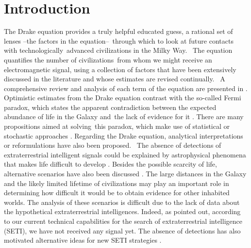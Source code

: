 \documentclass[crop]{CSLB}
\begin{document}
\maketitle


\section{Introduction}\label{S_motivations}

The Drake equation  \citep{drake_intelligent_1962} provides a truly
helpful educated guess, a rational set of lenses --the factors in the
equation-- through which to look at future contacts with
technologically advanced civilizations in the Milky Way. 
%
The equation quantifies the number of civilizations from whom we might
receive an electromagnetic signal, using a collection of factors that
have been extensively discussed in the literature and whose estimates
are revised continually. 
%
A comprehensive review and analysis of each term of the equation are
presented in \citet{vakoch_drake_2015}.
%
Optimistic estimates from the Drake equation contrast with the
so-called Fermi paradox, which states the apparent contradiction between the
expected abundance of life in the Galaxy and the lack of evidence for
it \citep[e.g. ][]{hart_explanation_1975, brin_great_1983,
barlow_galactic_2012, forgan_galactic_2016, anchordoqui_is_2017,
Sotos_biotechnology_2019, carroll_nellemback_fermi_2019}.
%
There are many propositions aimed at solving this paradox, which make
use of statistical \citep{solomonides_probabilistic_2016, horvat_calculating_2007,
maccone_statistical_2015} or stochastic approaches
\citep{forgan_numerical_2009, bloetscher_using_2019,
glade_stochastic_2011, forgan_numerical_2010}.
%
Regarding the Drake equation, analytical interpretations
\citep{prantzos_joint_2013, smith_broadcasting_2009} or reformulations
\citep[][and references therein]{burchell_whither_2006} have also been
proposed. 
%
The absence of detections of extraterrestrial intelligent signals
could be explained by
astrophysical phenomena that makes life difficult to develop
\citep{annis_astrophysical_1999}.
%
Besides the possible scarcity of life,
alternative scenarios have also been discussed
\citep{barlow_galactic_2013, lampton_information_2013,
conway_three_2018, forgan_galactic_2017}.
%
The large distances in the Galaxy and the likely limited lifetime of
civilizations may play an important role in determining how difficult it
would be to obtain evidence for other inhabited worlds.
%
The analysis of these scenarios is difficult due to the lack of data
about the hypothetical extraterrestrial intelligences.
%
Indeed, as \citep{tarter_search_2001} pointed out, according to our
current technical capabilities for the search of extraterrestrial
intelligence (SETI), we have not received any signal yet.
%
The absence of detections has also motivated alternative ideas for new
SETI strategies \citep{forgan_exoplanet_2017, balbi_impact_2018,
loeb_eavesdropping_2006, maccone_KLT_2010, tarter_advancing_2009,
enriquez_breakthrough_2017, loeb_relative_2016, maccone_SETI_2011,
lingam_relative_2019, wright_theGsearch_2015, maccone_SETI_2013,
maccone_lognormals_2014, harp_application_2018,
forgan_possibility_2013, forgan_galactic_2017, funes_searching_2019}.
\end{document}
